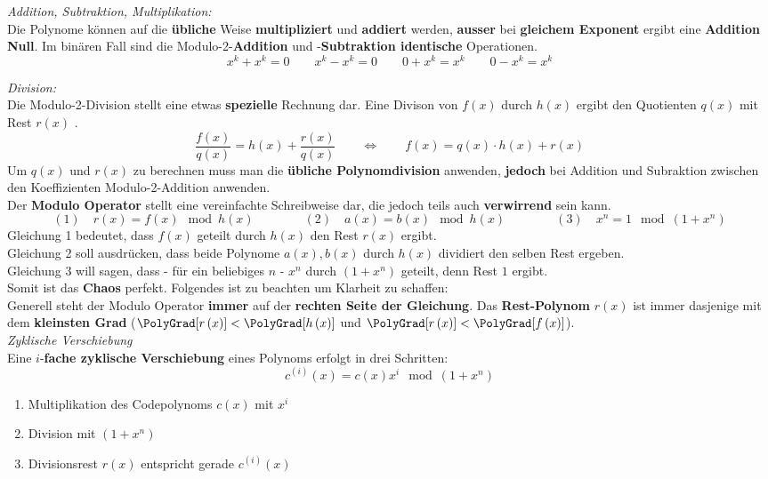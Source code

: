 \textit{Addition, Subtraktion, Multiplikation:} \\
Die Polynome können auf die \textbf{übliche} Weise \textbf{multipliziert} und \textbf{addiert} werden,
\textbf{ausser} bei \textbf{gleichem Exponent} ergibt eine \textbf{Addition Null}.
Im binären Fall sind die Modulo-2-\textbf{Addition} und
-\textbf{Subtraktion identische} Operationen. 
$$ x^k + x^k = 0 \qquad x^k - x^k = 0 \qquad 0 + x^k = x^k \qquad 0 - x^k = x^k$$

\textit{Division:}\\
Die Modulo-2-Division stellt eine etwas \textbf{spezielle} Rechnung dar.
Eine Divison von \boldmath$f(x)$ durch $h(x)$ ergibt den Quotienten $q(x)$ mit Rest $r(x)$
\unboldmath . 
$$ \dfrac{f(x)}{q(x)} = h(x) + \dfrac{r(x)}{q(x)} \qquad \Longleftrightarrow \qquad f(x) = q(x)
\cdot h(x) + r(x)$$ 
Um $q(x)$ und $r(x)$ zu berechnen muss man die \textbf{übliche Polynomdivision} anwenden, \textbf{jedoch}
bei Addition und Subraktion zwischen den Koeffizienten Modulo-2-Addition anwenden. \\ 
Der \textbf{Modulo Operator} stellt eine vereinfachte Schreibweise dar, die jedoch teils auch
\textbf{verwirrend} sein kann.
$$ (1) \quad r(x) = f(x) \mod{h(x)} \qquad \qquad 
(2) \quad a(x) = b(x) \mod{h(x)} \qquad \qquad 
(3) \quad x^n = 1 \mod{(1 + x^n)}$$
Gleichung 1 bedeutet, dass $f(x)$ geteilt durch $h(x)$ den Rest $r(x)$ ergibt. \\
Gleichung 2 soll ausdrücken, dass beide Polynome $a(x), b(x)$ durch $h(x)$ dividiert den selben
Rest ergeben. \\
Gleichung 3 will sagen, dass - für ein beliebiges $n$ - $x^n$ durch $(1 + x^n)$ geteilt, denn Rest
$1$ ergibt. \\
Somit ist das \textbf{Chaos} perfekt. Folgendes ist zu beachten um Klarheit zu schaffen:\\
Generell steht der Modulo Operator \textbf{immer} auf der \textbf{rechten Seite der Gleichung}. 
Das \textbf{Rest-Polynom} $r(x)$ ist immer dasjenige mit dem \textbf{kleinsten Grad
}($\PolyGrad[r \left( x \right)] < \PolyGrad[h \left(x \right)]$ und
$\PolyGrad[r \left(x \right) ] < \PolyGrad[f \left( x \right)]$).
\\

\textit{Zyklische Verschiebung} \\
Eine $i$-\textbf{fache zyklische Verschiebung} eines Polynoms erfolgt in drei Schritten:
$$ c^{(i)}(x) = c(x) x^i \mod{(1+x^n)}$$
\begin{enumerate}
  \item Multiplikation des Codepolynoms $c(x)$ mit $x^i$
  \item Division mit $(1+x^n)$
  \item Divisionsrest $r(x)$ entspricht gerade $c^{(i)}(x)$
\end{enumerate}

